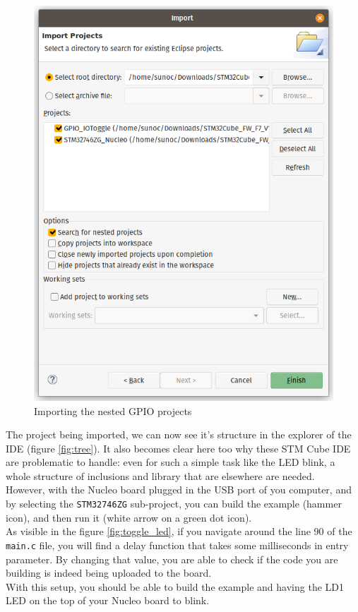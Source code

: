 \documentclass[10pt]{article}
\begin{document}
\begin{figure}[!h]
  \centering
  \includegraphics[width=.5\textwidth]{./img/project.png}
  \caption{Importing the nested GPIO projects}
  \label{fig:project}
\end{figure}

The project being imported, we can now see it's structure in the explorer of the IDE (figure \ref{fig:tree}). It also becomes clear here too why these STM Cube IDE are problematic to handle: even for such a simple task like the LED blink, a whole structure of inclusions and library that are elsewhere are needed.\\

However, with the Nucleo board plugged in the USB port of you computer, and by selecting the \verb|STM32746ZG| sub-project, you can build the example (hammer icon), and then run it (white arrow on a green dot icon).\\
As visible in the figure \ref{fig:toggle_led}, if you navigate around the line 90 of the \verb|main.c| file, you will find a delay function that takes some milliseconds in entry parameter. By changing that value, you are able to check if the code you are building is indeed being uploaded to the board.\\

With this setup, you should be able to build the example and having the LD1 LED on the top of your Nucleo board to blink.
\end{document}
